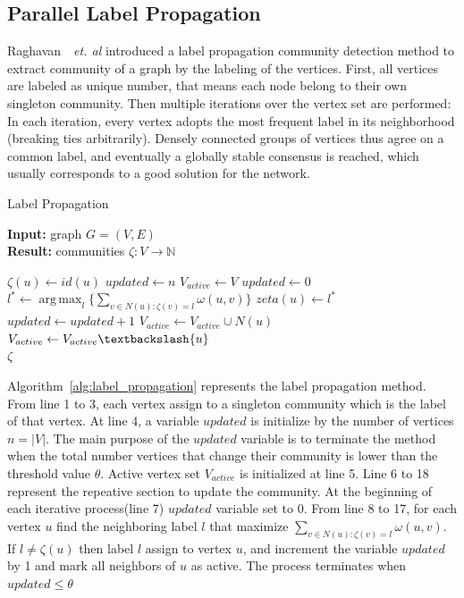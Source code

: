 \documentclass[default,iicol]{sn-jnl}%
\DeclareMathOperator*{\argmax}{arg\,max}
\theoremstyle{thmstyleone}%
\theoremstyle{thmstyletwo}%
\theoremstyle{thmstylethree}%
\begin{document}
\subsection{Parallel Label Propagation}
\label{sec:label_propagation}
Raghavan~\cite{raghavan2007near}~\textit{et. al} introduced a label propagation community detection 
method to extract community of a graph by the labeling of the vertices. First, all vertices are labeled as unique 
number, that means each node belong to their own singleton community. Then multiple iterations over the 
vertex set are performed:  In each iteration, every vertex adopts the most frequent label in its neighborhood 
(breaking ties arbitrarily). Densely connected groups of vertices thus agree on a common label, and eventually 
a globally stable consensus is reached, which usually corresponds to a good solution for the network. 

\begin{algorithm}
  \caption{Label Propagation}\label{alg:label_propagation}
  \begin{flushleft}
  \textbf{Input: }graph $G=(V, E)$\\
  \textbf{Result: }communities $\zeta:V\to\mathbb{N}$
  \end{flushleft}
  \begin{algorithmic}[1]
  	\State $\zeta(u) \leftarrow id(u)$
  \EndFor
  \State $updated \leftarrow n$
  \State $V_{active} \leftarrow V$
    \Repeat
    	\State $updated \leftarrow 0$
        \State $l^{*} \leftarrow\argmax_{l}{\{\sum_{v\in N(u):\zeta(v)=l} \omega(u,v)\}}$
        	\State  $zeta(u) \leftarrow l^{*}$
        	\State $updated \leftarrow updated + 1$
        	\State $V_{active} \leftarrow V_{active}\cup N(u)$
        \Else
        	\State $V_{active} \leftarrow V_{active} \textbackslash \{u\}$
        \EndIf
      \EndFor
    \\
    \Return $\zeta$
  \end{algorithmic}
\end{algorithm}
Algorithm~\ref{alg:label_propagation} represents the label propagation method. From line 1 to 3,
each vertex assign to a singleton community which is the label of that vertex.  At line 4, a variable 
$updated$ is initialize by the number of vertices $n=|V|$. The main purpose of the $updated$ variable 
is to terminate the method when the total number vertices that change their community is lower than 
the threshold value $\theta$. Active vertex set $V_{active}$ is initialized at line 5. Line 6 to 18 represent 
the repeative section to update the community. At the beginning of each iterative process(line 7) $updated$
variable set to 0. From line 8 to 17, for each vertex $u$ find the neighboring label $l$ that 
maximize $\sum_{v\in N(u):\zeta(v)=l}\omega(u,v)$. If $l \neq\zeta(u)$ then label $l$ assign to vertex $u$,
and increment the variable $updated$ by 1 and mark all neighbors of $u$ as active. The process terminates 
when $updated\leq\theta$ 
\end{document}
